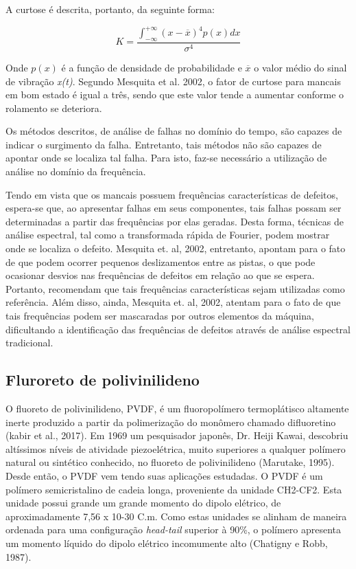 \documentclass[
	12pt,				
	oneside,			
	a4paper,			
	english,			
	brazil				
	]{abntex2ppgsi}
\begin{document}
A curtose é descrita, portanto, da seguinte forma:

\[K = \frac{ \int_{-\infty}^{+\infty} (x - \overline{x})^{4}p(x)dx } {\sigma^{4}} \]

Onde $p(x)$ é a função de densidade de probabilidade e $\overline{x}$ o valor médio do sinal de vibração \textit{x(t)}. Segundo Mesquita et al. 2002, o fator de curtose para mancais em bom estado é igual a três, sendo que este valor tende a aumentar conforme o rolamento se deteriora. 

Os métodos descritos, de análise de falhas no domínio do tempo, são capazes de indicar o surgimento da falha. Entretanto, tais métodos não são capazes de apontar onde se localiza tal falha. Para isto, faz-se necessário a utilização de análise no domínio da frequência. 

Tendo em vista que os mancais possuem frequências características de defeitos, espera-se que, ao apresentar falhas em seus componentes, tais falhas possam ser determinadas a partir das frequências por elas geradas. Desta forma, técnicas de análise espectral, tal como a transformada rápida de Fourier, podem mostrar onde se localiza o defeito. Mesquita et. al, 2002, entretanto, apontam para o fato de que podem ocorrer pequenos deslizamentos entre as pistas, o que pode ocasionar desvios nas frequências de defeitos em relação ao que se espera. Portanto, recomendam que tais frequências características sejam utilizadas como referência. Além disso, ainda, Mesquita et. al, 2002, atentam para o fato de que tais frequências podem ser mascaradas por outros elementos da máquina, dificultando a identificação das frequências de defeitos através de análise espectral tradicional.

\subsection{\textbf{Fluroreto de polivinilideno}}

O fluoreto de polivinilideno, PVDF, é um fluoropolímero termoplátisco altamente inerte produzido a partir da polimerização do monômero chamado difluoretino (kabir et al., 2017). Em 1969 um pesquisador japonês, Dr. Heiji Kawai, descobriu altíssimos níveis de atividade piezoelétrica, muito superiores a qualquer polímero natural ou sintético conhecido, no fluoreto de polivinilideno (Marutake, 1995). Desde então, o PVDF vem tendo suas aplicações estudadas. O PVDF é um polímero semicristalino de cadeia longa, proveniente da unidade CH2-CF2. Esta unidade possui grande um grande momento do dipolo elétrico, de aproximadamente 7,56 x 10-30 C.m. Como estas unidades se alinham de maneira ordenada para uma configuração \textit{head-tail} superior à 90\%, o polímero apresenta um momento líquido do dipolo elétrico incomumente alto (Chatigny e Robb, 1987).
\end{document}
